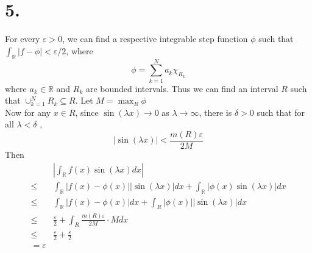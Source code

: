 \documentclass[11pt]{article}
\theoremstyle{mystyle}
\theoremstyle{definition}
\begin{document}
\section*{5.}
For every $\varepsilon > 0$, we can find a respective integrable step function $\phi$ such that $\int_\mathbb{R} |f - \phi| < \varepsilon/2$, where 
\[
  \phi = \sum_{k=1}^N a_k \chi_{R_k}
\]
where $a_k \in \mathbb{R}$ and $R_k$ are bounded intervals. Thus we can find an interval $R$ such that $\cup_{k=1}^N R_k \subseteq R$. Let $M = \max_R \phi$  \\
Now for any $x \in R$, since $\sin(\lambda x) \to 0$ as $\lambda \to \infty$, there is $\delta > 0$ such that for all $\lambda < \delta$ , 
\[
  |\sin(\lambda x)| < \displaystyle\frac{m(R) \varepsilon}{2M}
\]
Then 
\begin{align*}
  & \left|\int_\mathbb{R} f(x) \sin(\lambda x) dx \right| \\ 
  \le & \int_\mathbb{R} |f(x) - \phi(x)| |\sin(\lambda x)| dx + \int_\mathbb{R} |\phi(x) \sin(\lambda x)| dx \\
  \le & \int_\mathbb{R} |f(x) - \phi(x)| dx + \int_R |\phi(x)| |\sin(\lambda x)| dx \\
  \le &  \displaystyle\frac{\varepsilon}{2} + \int_R \displaystyle\frac{m(R) \varepsilon}{2M} \cdot M dx \\
  \le & \displaystyle\frac{\varepsilon}{2} + \displaystyle\frac{\varepsilon}{2} \\
  = \varepsilon
\end{align*}
\end{document}

